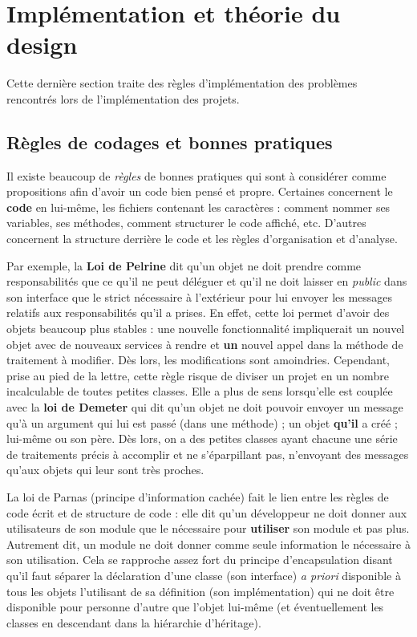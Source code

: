 \documentclass{article}
\begin{document}
\section{Implémentation et théorie du design}
	Cette dernière section traite des règles d'implémentation des problèmes rencontrés lors de l'implémentation des projets.

	\subsection{Règles de codages et bonnes pratiques}
		Il existe beaucoup de \textit{règles} de bonnes pratiques qui sont à considérer comme propositions afin d'avoir un code bien pensé et propre. Certaines concernent le \textbf{code} en lui-même,
		les fichiers contenant les caractères : comment nommer ses variables, ses méthodes, comment structurer le code affiché, etc. D'autres concernent la structure derrière le code et les règles
		d'organisation et d'analyse.

		Par exemple, la \textbf{Loi de Pelrine} dit qu'un objet ne doit prendre comme responsabilités que ce qu'il ne peut déléguer et qu'il ne doit laisser en \textit{public} dans son interface
		que le strict nécessaire à l'extérieur pour lui envoyer les messages relatifs aux responsabilités qu'il a prises. En effet, cette loi permet d'avoir des objets beaucoup plus stables : une
		nouvelle fonctionnalité impliquerait un nouvel objet avec de nouveaux services à rendre et \textbf{un} nouvel appel dans la méthode de traitement à modifier. Dès lors, les modifications sont
		amoindries. Cependant, prise au pied de la lettre, cette règle risque de diviser un projet en un nombre incalculable de toutes petites classes. Elle a plus de sens lorsqu'elle est couplée
		avec la \textbf{loi de Demeter} qui dit qu'un objet ne doit pouvoir envoyer un message qu'à un argument qui lui est passé (dans une méthode) ; un objet \textbf{qu'il} a créé ; lui-même
		ou son père. Dès lors, on a des petites classes ayant chacune une série de traitements précis à accomplir et ne s'éparpillant pas, n'envoyant des messages qu'aux objets qui leur sont très
		proches.

		La loi de Parnas (principe d'information cachée) fait le lien entre les règles de code écrit et de structure de code : elle dit qu'un développeur ne doit donner aux utilisateurs de son module
		que le nécessaire pour \textbf{utiliser} son module et pas plus. Autrement dit, un module ne doit donner comme seule information le nécessaire à son utilisation. Cela se rapproche assez fort
		du principe d'encapsulation disant qu'il faut séparer la déclaration d'une classe (son interface) \textit{a priori} disponible à tous les objets l'utilisant de sa définition (son
		implémentation) qui ne doit être disponible pour personne d'autre que l'objet lui-même (et éventuellement les classes en descendant dans la hiérarchie d'héritage).
\end{document}
